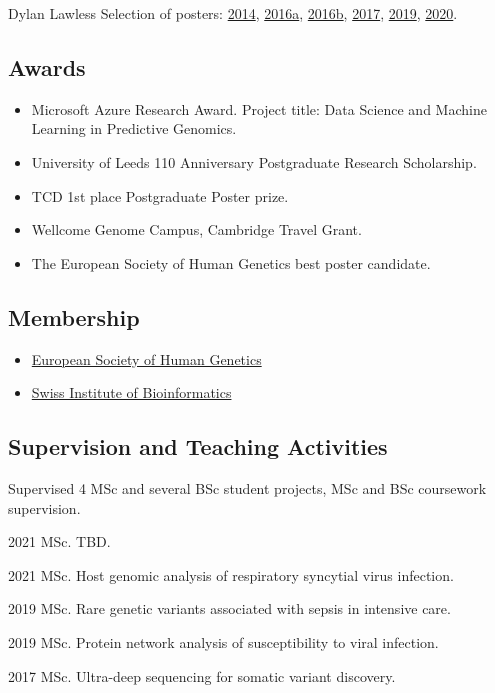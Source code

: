 \documentclass[12pt,a4paper]{article}
\begin{document}
\begin{cv}{Dylan Lawless}
\noindent Selection of posters:
\href{https://dylanlawless.github.io/resume/blob/main/pdf/posters/2014_lawless_poxviral_evasion}{2014},
\href{https://dylanlawless.github.io/resume/blob/main/pdf/posters/2016_ESID_lawless_RAG1}{2016a},
\href{https://dylanlawless.github.io/resume/blob/main/pdf/posters/2016_ESID_lawless_TTC7A}{2016b},
\href{https://dylanlawless.github.io/resume/blob/main/pdf/posters/2017_ESID_lawless_TNFAIP3_A20}{2017},
\href{https://dylanlawless.github.io/resume/blob/main/pdf/posters/2019_ESHG_lawless_viral_succept}{2019},
\href{https://dylanlawless.github.io/resume/blob/main/pdf/posters/2020_lawless_rare_variant_networks}{2020}.

\subsection*{Awards}
\begin{itemize}
\item Microsoft Azure Research Award. Project title: Data Science and Machine Learning in Predictive Genomics. 
\item University of Leeds 110 Anniversary Postgraduate Research Scholarship.
\item TCD 1st place Postgraduate Poster prize.
\item Wellcome Genome Campus, Cambridge Travel Grant.
\item The European Society of Human Genetics best poster candidate.
\end{itemize}


\subsection*{Membership}
\begin{itemize}
\item \href{https://www.eshg.org}{European Society of Human Genetics}
\item \href{https://www.sib.swiss}{Swiss Institute of Bioinformatics}
\end{itemize}

\subsection*{Supervision and Teaching Activities}
Supervised 4 MSc and several BSc student projects, MSc and BSc coursework supervision.
\begin{cvlist}{}
  \item [2021 MSc. TBD.]
  \item [2021 MSc.  Host genomic analysis of respiratory syncytial virus infection.]
  \item [2019 MSc. Rare genetic variants associated with sepsis in intensive care.]
  \item [2019 MSc. Protein network analysis of susceptibility to viral infection.]
 \item [2017 MSc. Ultra-deep sequencing for somatic variant discovery.]


\end{cvlist}
\end{cv}
\end{document}
